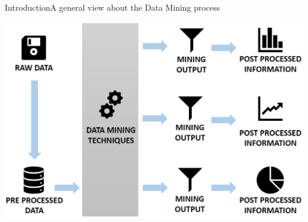 \begin{frame}{Introduction}{A general view about the Data Mining process}
	\begin{centering}
		\vspace{0.2cm}
		\hspace{-0.2cm}\includegraphics[scale=0.25]{img1_noback.png}
	\end{centering}
\end{frame}

